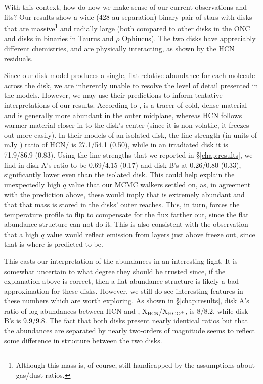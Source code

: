 With this context, how do now we make sense of our current observations and fits? Our results show a wide (428 au separation) binary pair of stars with disks that are massive\footnote{Although this mass is, of course, still handicapped by the assumptions about gas/dust ratios.} and radially large (both compared to other disks in the ONC and disks in binaries in Taurus and $\rho$ Ophiucus). The two disks have appreciably different chemistries, and are physically interacting, as shown by the HCN residuals.


Since our disk model produces a single, flat relative abundance for each molecule across the disk, we are inherently unable to resolve the level of detail presented in the models. However, we may use their predictions to inform tentative interpretations of our results. According to \citet{Walsh2013}, \hco{} is a tracer of cold, dense material and is generally more abundant in the outer midplane, whereas HCN follows warmer material closer in to the disk's center (since it is non-volatile, it freezes out more easily). In their models of an isolated disk, the line strength (in units of mJy \kms) ratio of HCN/\hco{} is 27.1/54.1 (0.50), while in an irradiated disk it is 71.9/86.9 (0.83). Using the line strengths that we reported in \S\ref{chap:results}, we find in disk A's ratio to be 0.69/4.15 (0.17) and disk B's at 0.26/0.80 (0.33), significantly lower even than the isolated disk. This could help explain the unexpectedly high $q$ value that our MCMC walkers settled on, as, in agreement with the \citet{Walsh2013} prediction above, these would imply that \hco{} is extremely abundant and that that mass is stored in the disks' outer reaches. This, in turn, forces the temperature profile to flip to compensate for the flux farther out, since the flat abundance structure can not do it. This is also consistent with the \citet{Schwarz2016} observation that a high $q$ value would reflect emission from layers just above freeze out, since that is where \hco{} is predicted to be.



This casts our interpretation of the abundances in an interesting light. It is somewhat uncertain to what degree they should be trusted since, if the explanation above is correct, then a flat abundance structure is likely a bad approximation for these disks. However, we still do see interesting features in these numbers which are worth exploring. As shown in \S\ref{chap:results}, disk A's ratio of log abundances between HCN and \hco, X$_\text{HCN}$/X$_\text{HCO$^+$}$, is 8/8.2, while disk B's is 9.9/9.8. The fact that both disks present nearly identical ratios but that the abundances are separated by nearly two-orders of magnitude seems to reflect some difference in structure between the two disks.

